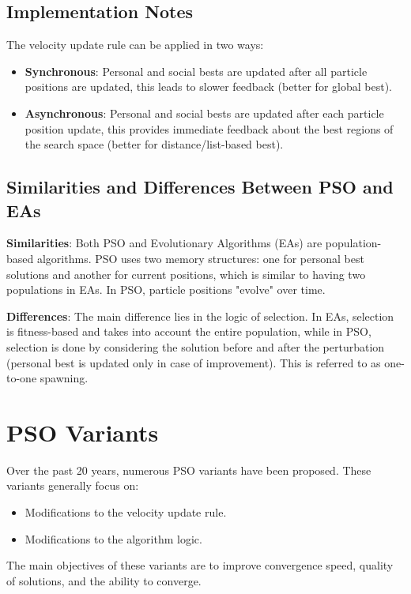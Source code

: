 \subsection*{Implementation Notes}
The velocity update rule can be applied in two ways:
\begin{itemize}
    \item \textbf{Synchronous}: Personal and social bests are updated after all particle positions are updated, this leads to slower feedback (better for global best).
    \item \textbf{Asynchronous}: Personal and social bests are updated after each particle position update, this provides immediate feedback about the best regions of the search space (better for distance/list-based best).
\end{itemize}

\subsection*{Similarities and Differences Between PSO and EAs}
\textbf{Similarities}: Both PSO and Evolutionary Algorithms (EAs) are population-based algorithms. PSO uses two memory structures: one for personal best solutions and another for current positions, which is similar to having two populations in EAs. In PSO, particle positions "evolve" over time.

\textbf{Differences}: The main difference lies in the logic of selection. In EAs, selection is fitness-based and takes into account the entire population, while in PSO, selection is done by considering the solution before and after the perturbation (personal best is updated only in case of improvement). This is referred to as one-to-one spawning.

\section{PSO Variants}
Over the past 20 years, numerous PSO variants have been proposed. These variants generally focus on:

\begin{itemize}
    \item Modifications to the velocity update rule.
    \item Modifications to the algorithm logic.
\end{itemize}

The main objectives of these variants are to improve convergence speed, quality of solutions, and the ability to converge.


